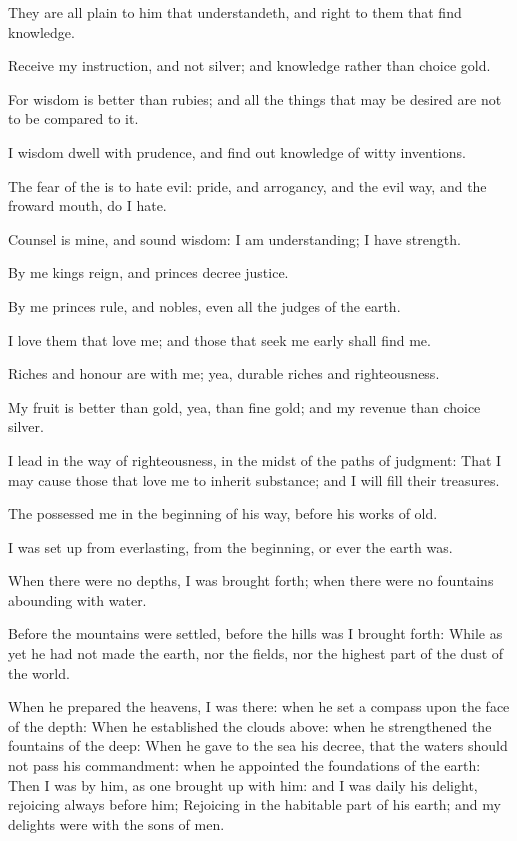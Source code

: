 \Verse They are all plain to him that understandeth, and right to them that find knowledge.

\Verse Receive my instruction, and not silver; and knowledge rather than choice gold.

\Verse For wisdom is better than rubies; and all the things that may be desired are not to be compared to it.

\Verse I wisdom dwell with prudence, and find out knowledge of witty inventions.

\Verse The fear of the \LORD is to hate evil: pride, and arrogancy, and the evil way, and the froward mouth, do I hate.

\Verse Counsel is mine, and sound wisdom: I am understanding; I have strength.

\Verse By me kings reign, and princes decree justice.

\Verse By me princes rule, and nobles, even all the judges of the earth.

\Verse I love them that love me; and those that seek me early shall find me.

\Verse Riches and honour are with me; yea, durable riches and righteousness.

\Verse My fruit is better than gold, yea, than fine gold; and my revenue than choice silver.

\Verse I lead in the way of righteousness, in the midst of the paths of judgment: \Verse That I may cause those that love me to inherit substance; and I will fill their treasures.

\Verse The \LORD possessed me in the beginning of his way, before his works of old.

\Verse I was set up from everlasting, from the beginning, or ever the earth was.

\Verse When there were no depths, I was brought forth; when there were no fountains abounding with water.

\Verse Before the mountains were settled, before the hills was I brought forth: \Verse While as yet he had not made the earth, nor the fields, nor the highest part of the dust of the world.

\Verse When he prepared the heavens, I was there: when he set a compass upon the face of the depth: \Verse When he established the clouds above: when he strengthened the fountains of the deep: \Verse When he gave to the sea his decree, that the waters should not pass his commandment: when he appointed the foundations of the earth: \Verse Then I was by him, as one brought up with him: and I was daily his delight, rejoicing always before him; \Verse Rejoicing in the habitable part of his earth; and my delights were with the sons of men.

